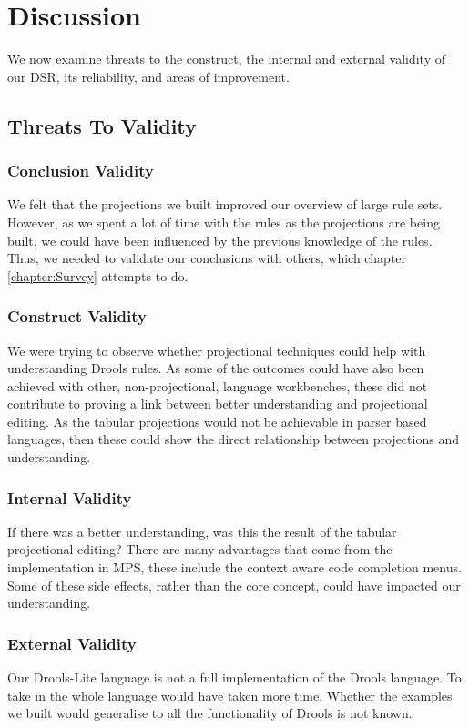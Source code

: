 \section{Discussion}
\label{section:dsr_discussion}

We now examine threats to the construct, the internal and external validity of our DSR, its reliability, and areas of improvement.


\subsection{Threats To Validity} 

\subsubsection{Conclusion Validity}
We felt that the projections we built improved our overview of large rule sets.
However, as we spent a lot of time with the rules as the projections are being built, we could have been influenced by the previous knowledge of the rules.
Thus, we needed to validate our conclusions with others, which chapter \ref{chapter:Survey} attempts to do.

\subsubsection{Construct Validity}
We were trying to observe whether projectional techniques could help with understanding Drools rules. 
As some of the outcomes could have also been achieved with other, non-projectional, language workbenches, these did not contribute to proving a link between better understanding and projectional editing.
As the tabular projections would not be achievable in parser based languages, then these could show the direct relationship between projections and understanding.

\subsubsection{Internal Validity}
If there was a better understanding, was this the result of the tabular projectional editing?
There are many advantages that come from the implementation in MPS, these include the context aware code completion menus.
Some of these side effects, rather than the core concept, could have impacted our understanding.

\subsubsection{External Validity}
Our Drools-Lite language is not a full implementation of the Drools language.
To take in the whole language would have taken more time.
Whether the examples we built would generalise to all the functionality of Drools is not known. 

